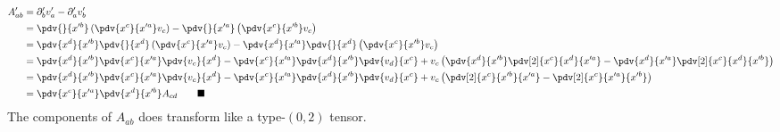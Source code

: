 \documentclass[12pt]{article}
\newcommand{\dualvary}[2]{\pdv{x^{#1}}{x'^{#2}}}
\begin{document}
    \subsubsection{} {
    \begin{align*}
        A'_{ab} & =  \partial'_b v'_a - \partial'_a v'_b\\
               & = \pdv{}{x^{\prime b}}\left(\dualvary c a v_c\right) - \pdv{}{x^{\prime a}}\left(\dualvary c b v_c\right)\\
               & = \dualvary{d}{b}\pdv{}{x^{d}}\left(\dualvary c a v_c\right) - \dualvary{d}{a}\pdv{}{x^{d}}\left(\dualvary c b v_c\right)\\
               & = \dualvary{d}{b}\dualvary c a\pdv{v_c}{x^{d}} - \dualvary{c}{a}\dualvary d b\pdv{v_d}{x^{c}} + v_c\left(\dualvary{d}{b}\pdv[2]{x^c}{x^d}{x^{\prime a}}-\dualvary{d}{a}\pdv[2]{x^c}{x^d}{x^{\prime b}}\right) \\
               & = \dualvary{d}{b}\dualvary c a\pdv{v_c}{x^{d}} - \dualvary{c}{a}\dualvary d b\pdv{v_d}{x^{c}} + v_c\left(\pdv[2]{x^c}{x^{\prime b}}{x^{\prime a}} -\pdv[2]{x^c}{x^{\prime a}}{x^{\prime b}}\right)            \\
               & = \dualvary c a\dualvary db A_{cd} \qquad \blacksquare
    \end{align*}}
    The components of $A_{ab}$ does transform like a type-$(0,2)$ tensor.
\end{document}
